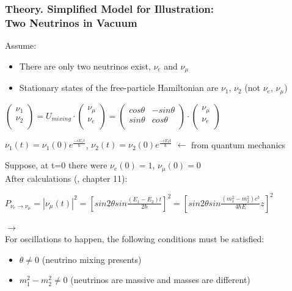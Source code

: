 \begin{frame}\frametitle{Theory. Simplified Model for Illustration: \\ Two Neutrinos in Vacuum}
  \scriptsize
  Assume:
  \begin{itemize}
     \item There are only two neutrinos exist, $\nu_e$ and $\nu_\mu$
     \item Stationary states of the free-particle Hamiltonian are $\nu_1$, $\nu_2$ (not $\nu_e$, $\nu_\mu$)
  \end{itemize}

  \begin{center}
  $ \begin{pmatrix} \nu_1 \\ \nu_2 \\ \end{pmatrix}
  = U_{mixing}\cdot \begin{pmatrix} \nu_{\mu} \\ \nu_{e} \\ \end{pmatrix} = 
  \begin{pmatrix}
  cos\theta & -sin\theta \\
  sin\theta & cos\theta \\
  \end{pmatrix}
  \cdot
  \begin{pmatrix} \nu_{\mu} \\ \nu_{e} \\ \end{pmatrix}$\\

  \end{center}

  \begin{center}
  $\nu_1(t)=\nu_1(0)e^{\frac{-iE_1t}{\hbar}}$, $\nu_2(t)=\nu_2(0)e^{\frac{-iE_2t}{\hbar}}$ $\leftarrow$ from quantum mechanics\\
  \end{center}
  Suppose, at t=0 there were $\nu_e(0)=1$, $\nu_\mu(0)=0$\\
  After calculations (\cite{ref_Griffiths}, chapter 11): 
  \begin{center}
  $P_{\nu_e \rightarrow \nu_\mu}=|\nu_\mu(t)|^2=[{sin2\theta}sin{\frac{(E_1-E_2)t}{2\hbar}}]^2=[{sin2\theta}sin{\frac{(m_1^2-m_2^2)c^3}{4\hbar{E}}z}]^2$\\  
  \end{center}
  \large $\rightarrow$\\
  \scriptsize
  For oscillations to happen, the following conditions must be satisfied:
  \begin{itemize}
     \item $\theta \neq 0$ (neutrino mixing presents)
     \item $m_1^2-m_2^2 \neq 0$ (neutrinos are massive and masses are different)
  \end{itemize}
\end{frame}

